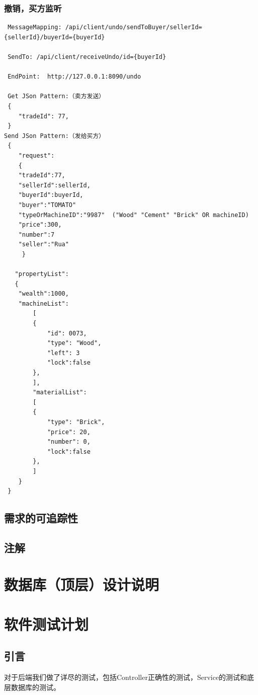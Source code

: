 \documentclass{article}
\begin{document}
				\subsubsection{撤销，买方监听}
\begin{lstlisting}
 MessageMapping: /api/client/undo/sendToBuyer/sellerId={sellerId}/buyerId={buyerId}

 SendTo: /api/client/receiveUndo/id={buyerId}

 EndPoint:  http://127.0.0.1:8090/undo

 Get JSon Pattern:（卖方发送）
 {
    "tradeId": 77,
 }
Send JSon Pattern:（发给买方）
 {
    "request":
    {
    "tradeId":77,
    "sellerId":sellerId,
    "buyerId":buyerId,
    "buyer":"TOMATO"
    "typeOrMachineID":"9987"  ("Wood" "Cement" "Brick" OR machineID)
    "price":300,
    "number":7
    "seller":"Rua"
     }

   "propertyList":
   {
   	"wealth":1000,
   	"machineList":
    	[
        {
            "id": 0073,
            "type": "Wood",
            "left": 3
            "lock":false
        },
    	],
    	"materialList":
    	[
        {
            "type": "Brick",
            "price": 20,
            "number": 0,
            "lock":false
        },
    	]
    }
 }

\end{lstlisting}

		\subsection{需求的可追踪性}

		\subsection{注解}
		
\section{数据库（顶层）设计说明}
\label{数据库（顶层）设计说明}


	\section{软件测试计划}
		\label{软件测试计划}
		\subsection{引言}
			对于后端我们做了详尽的测试，包括Controller正确性的测试，Service的测试和底层数据库的测试。
\end{document}
